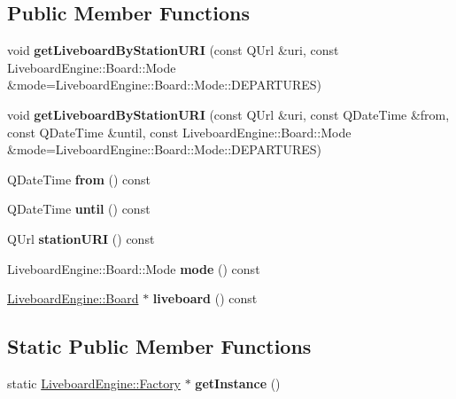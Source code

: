 \subsection*{Public Member Functions}
\begin{DoxyCompactItemize}
\item 
\mbox{\label{classLiveboardEngine_1_1Factory_a806d17edc5fb9687cc56d40e47607c56}} 
void {\bfseries get\+Liveboard\+By\+Station\+U\+RI} (const Q\+Url \&uri, const Liveboard\+Engine\+::\+Board\+::\+Mode \&mode=Liveboard\+Engine\+::\+Board\+::\+Mode\+::\+D\+E\+P\+A\+R\+T\+U\+R\+ES)
\item 
\mbox{\label{classLiveboardEngine_1_1Factory_addcb51b3e2aea11e927ea4336d1d8136}} 
void {\bfseries get\+Liveboard\+By\+Station\+U\+RI} (const Q\+Url \&uri, const Q\+Date\+Time \&from, const Q\+Date\+Time \&until, const Liveboard\+Engine\+::\+Board\+::\+Mode \&mode=Liveboard\+Engine\+::\+Board\+::\+Mode\+::\+D\+E\+P\+A\+R\+T\+U\+R\+ES)
\item 
\mbox{\label{classLiveboardEngine_1_1Factory_a8baf19d418f12486528dd107b0e40bff}} 
Q\+Date\+Time {\bfseries from} () const
\item 
\mbox{\label{classLiveboardEngine_1_1Factory_a42f78670fbec877ac3209fb30d6e5d37}} 
Q\+Date\+Time {\bfseries until} () const
\item 
\mbox{\label{classLiveboardEngine_1_1Factory_aa6b3c6593412c0cdb805a0f64b779035}} 
Q\+Url {\bfseries station\+U\+RI} () const
\item 
\mbox{\label{classLiveboardEngine_1_1Factory_a066656be247d7c91ddd55bd2e0dba9e1}} 
Liveboard\+Engine\+::\+Board\+::\+Mode {\bfseries mode} () const
\item 
\mbox{\label{classLiveboardEngine_1_1Factory_a65f9e5079dce07a63e68ced303438797}} 
\mbox{\hyperlink{classLiveboardEngine_1_1Board}{Liveboard\+Engine\+::\+Board}} $\ast$ {\bfseries liveboard} () const
\end{DoxyCompactItemize}
\subsection*{Static Public Member Functions}
\begin{DoxyCompactItemize}
\item 
\mbox{\label{classLiveboardEngine_1_1Factory_af5820597b574ffe1a3b20fb2c080aa00}} 
static \mbox{\hyperlink{classLiveboardEngine_1_1Factory}{Liveboard\+Engine\+::\+Factory}} $\ast$ {\bfseries get\+Instance} ()
\end{DoxyCompactItemize}

